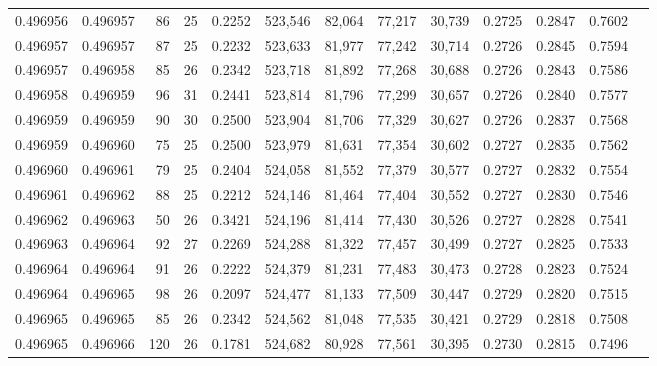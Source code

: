 \begin{tabular}{rrrrrrrrrrrrr}
0.496956 & 0.496957 &  86 &  25 &                                     0.2252 & 523,546 &  82,064 &  77,217 &  30,739 & 0.2725 & 0.2847 & 0.7602 \\
0.496957 & 0.496957 &  87 &  25 &                                     0.2232 & 523,633 &  81,977 &  77,242 &  30,714 & 0.2726 & 0.2845 & 0.7594 \\
0.496957 & 0.496958 &  85 &  26 &                                     0.2342 & 523,718 &  81,892 &  77,268 &  30,688 & 0.2726 & 0.2843 & 0.7586 \\
0.496958 & 0.496959 &  96 &  31 &                                     0.2441 & 523,814 &  81,796 &  77,299 &  30,657 & 0.2726 & 0.2840 & 0.7577 \\
0.496959 & 0.496959 &  90 &  30 &                                     0.2500 & 523,904 &  81,706 &  77,329 &  30,627 & 0.2726 & 0.2837 & 0.7568 \\
0.496959 & 0.496960 &  75 &  25 &                                     0.2500 & 523,979 &  81,631 &  77,354 &  30,602 & 0.2727 & 0.2835 & 0.7562 \\
0.496960 & 0.496961 &  79 &  25 &                                     0.2404 & 524,058 &  81,552 &  77,379 &  30,577 & 0.2727 & 0.2832 & 0.7554 \\
0.496961 & 0.496962 &  88 &  25 &                                     0.2212 & 524,146 &  81,464 &  77,404 &  30,552 & 0.2727 & 0.2830 & 0.7546 \\
0.496962 & 0.496963 &  50 &  26 &                                     0.3421 & 524,196 &  81,414 &  77,430 &  30,526 & 0.2727 & 0.2828 & 0.7541 \\
0.496963 & 0.496964 &  92 &  27 &                                     0.2269 & 524,288 &  81,322 &  77,457 &  30,499 & 0.2727 & 0.2825 & 0.7533 \\
0.496964 & 0.496964 &  91 &  26 &                                     0.2222 & 524,379 &  81,231 &  77,483 &  30,473 & 0.2728 & 0.2823 & 0.7524 \\
0.496964 & 0.496965 &  98 &  26 &                                     0.2097 & 524,477 &  81,133 &  77,509 &  30,447 & 0.2729 & 0.2820 & 0.7515 \\
0.496965 & 0.496965 &  85 &  26 &                                     0.2342 & 524,562 &  81,048 &  77,535 &  30,421 & 0.2729 & 0.2818 & 0.7508 \\
0.496965 & 0.496966 & 120 &  26 &                                     0.1781 & 524,682 &  80,928 &  77,561 &  30,395 & 0.2730 & 0.2815 & 0.7496 \\

\end{tabular}
